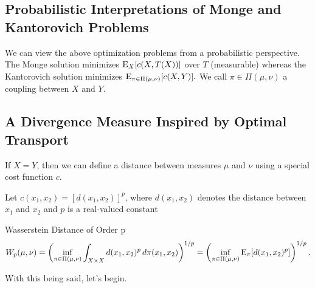 \subsection*{Probabilistic Interpretations of Monge and Kantorovich Problems}
We can view the above optimization problems from a probabilistic perspective. The Monge solution minimizes  $\mathrm{E}_{X}[c(X,T(X))]$ over $T$ (measurable) whereas the Kantorovich solution minimizes $\displaystyle\mathrm{E}_{\pi\in \Pi(\mu,\nu)}[c(X,Y)].$ We call $\pi \in \Pi(\mu,\nu)$ a coupling between $X$ and $Y$.

\subsection*{A Divergence Measure Inspired by Optimal Transport}
If $X=Y$, then we can define a distance between measures $\mu$ and $\nu$ using a special cost function $c$. 

Let $c(x_1,x_2) = [d(x_1,x_2)]^p$, where $d(x_1,x_2)$ denotes the distance between $x_1$ and $x_2$ and $p$ is a real-valued constant

\begin{definition}{Wasserstein Distance of Order p}
	\[
	W_p(\mu,\nu) = \left( \inf_{\pi\in \Pi(\mu,\nu)} \int_{X\times X} d(x_1,x_2)^p \,d\pi(x_1,x_2)\right)^{1/p} = \left( \inf_{\pi\in \Pi(\mu,\nu)} \mathrm{E}_{\pi}[d(x_1,x_2)^p] \right)^{1/p} .
	\]
\end{definition}

With this being said, let's begin.